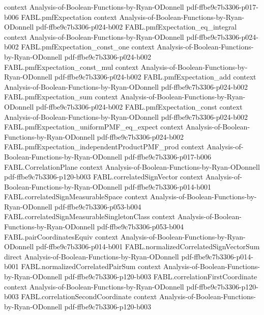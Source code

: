 \begin{theorem}
  {context}
  {Analysis-of-Boolean-Functions-by-Ryan-ODonnell}
  {pdf-ffbe9c7b3306-p017-b006}
\proofstep
  {FABL.pmfExpectation}
  {context}
  {Analysis-of-Boolean-Functions-by-Ryan-ODonnell}
  {pdf-ffbe9c7b3306-p024-b002}
\proofstep
  {FABL.pmfExpectation_eq_integral}
  {context}
  {Analysis-of-Boolean-Functions-by-Ryan-ODonnell}
  {pdf-ffbe9c7b3306-p024-b002}
\proofstep
  {FABL.pmfExpectation_const_one}
  {context}
  {Analysis-of-Boolean-Functions-by-Ryan-ODonnell}
  {pdf-ffbe9c7b3306-p024-b002}
\proofstep
  {FABL.pmfExpectation_const_mul}
  {context}
  {Analysis-of-Boolean-Functions-by-Ryan-ODonnell}
  {pdf-ffbe9c7b3306-p024-b002}
\proofstep
  {FABL.pmfExpectation_add}
  {context}
  {Analysis-of-Boolean-Functions-by-Ryan-ODonnell}
  {pdf-ffbe9c7b3306-p024-b002}
\proofstep
  {FABL.pmfExpectation_sum}
  {context}
  {Analysis-of-Boolean-Functions-by-Ryan-ODonnell}
  {pdf-ffbe9c7b3306-p024-b002}
\proofstep
  {FABL.pmfExpectation_const}
  {context}
  {Analysis-of-Boolean-Functions-by-Ryan-ODonnell}
  {pdf-ffbe9c7b3306-p024-b002}
\proofstep
  {FABL.pmfExpectation_uniformPMF_eq_expect}
  {context}
  {Analysis-of-Boolean-Functions-by-Ryan-ODonnell}
  {pdf-ffbe9c7b3306-p024-b002}
\proofstep
  {FABL.pmfExpectation_independentProductPMF_prod}
  {context}
  {Analysis-of-Boolean-Functions-by-Ryan-ODonnell}
  {pdf-ffbe9c7b3306-p017-b006}
\proofstep
  {FABL.CorrelationPlane}
  {context}
  {Analysis-of-Boolean-Functions-by-Ryan-ODonnell}
  {pdf-ffbe9c7b3306-p120-b003}
\proofstep
  {FABL.correlatedSignVector}
  {context}
  {Analysis-of-Boolean-Functions-by-Ryan-ODonnell}
  {pdf-ffbe9c7b3306-p014-b001}
\proofstep
  {FABL.correlatedSignMeasurableSpace}
  {context}
  {Analysis-of-Boolean-Functions-by-Ryan-ODonnell}
  {pdf-ffbe9c7b3306-p053-b004}
\proofstep
  {FABL.correlatedSignMeasurableSingletonClass}
  {context}
  {Analysis-of-Boolean-Functions-by-Ryan-ODonnell}
  {pdf-ffbe9c7b3306-p053-b004}
\proofstep
  {FABL.pairCoordinatesEquiv}
  {context}
  {Analysis-of-Boolean-Functions-by-Ryan-ODonnell}
  {pdf-ffbe9c7b3306-p014-b001}
\proofstep
  {FABL.normalizedCorrelatedSignVectorSum}
  {direct}
  {Analysis-of-Boolean-Functions-by-Ryan-ODonnell}
  {pdf-ffbe9c7b3306-p014-b001}
\proofstep
  {FABL.normalizedCorrelatedPairSum}
  {context}
  {Analysis-of-Boolean-Functions-by-Ryan-ODonnell}
  {pdf-ffbe9c7b3306-p120-b003}
\proofstep
  {FABL.correlationFirstCoordinate}
  {context}
  {Analysis-of-Boolean-Functions-by-Ryan-ODonnell}
  {pdf-ffbe9c7b3306-p120-b003}
\proofstep
  {FABL.correlationSecondCoordinate}
  {context}
  {Analysis-of-Boolean-Functions-by-Ryan-ODonnell}
  {pdf-ffbe9c7b3306-p120-b003}

\end{theorem}
